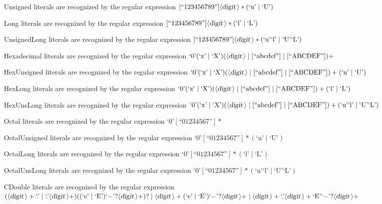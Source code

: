\documentclass[a4paper,11pt]{article}
\begin{document}
Unsigned literals are recognized by the regular expression
\([\mbox{``123456789''}] {\mbox{$\langle \mbox{{\sl digit }} \! \rangle$}}* (\mbox{`u'} \mid \mbox{`U'})\)

Long literals are recognized by the regular expression
\([\mbox{``123456789''}] {\mbox{$\langle \mbox{{\sl digit }} \! \rangle$}}* (\mbox{`l'} \mid \mbox{`L'})\)

UnsignedLong literals are recognized by the regular expression
\([\mbox{``123456789''}] {\mbox{$\langle \mbox{{\sl digit }} \! \rangle$}}* (\mbox{`u'} \mbox{`l'} \mid \mbox{`U'} \mbox{`L'})\)

Hexadecimal literals are recognized by the regular expression
\(\mbox{`0'} (\mbox{`x'} \mid \mbox{`X'}) ({\mbox{$\langle \mbox{{\sl digit }} \! \rangle$}} \mid [\mbox{``abcdef''}] \mid [\mbox{``ABCDEF''}])+\)

HexUnsigned literals are recognized by the regular expression
\(\mbox{`0'} (\mbox{`x'} \mid \mbox{`X'}) ({\mbox{$\langle \mbox{{\sl digit }} \! \rangle$}} \mid [\mbox{``abcdef''}] \mid [\mbox{``ABCDEF''}])+ (\mbox{`u'} \mid \mbox{`U'})\)

HexLong literals are recognized by the regular expression
\(\mbox{`0'} (\mbox{`x'} \mid \mbox{`X'}) ({\mbox{$\langle \mbox{{\sl digit }} \! \rangle$}} \mid [\mbox{``abcdef''}] \mid [\mbox{``ABCDEF''}])+ (\mbox{`l'} \mid \mbox{`L'})\)

HexUnsLong literals are recognized by the regular expression
\(\mbox{`0'} (\mbox{`x'} \mid \mbox{`X'}) ({\mbox{$\langle \mbox{{\sl digit }} \! \rangle$}} \mid [\mbox{``abcdef''}] \mid [\mbox{``ABCDEF''}])+ (\mbox{`u'} \mbox{`l'} \mid \mbox{`U'} \mbox{`L'})\)

Octal literals are recognized by the regular expression
\(\mbox{`0'} [\mbox{``01234567''}]*\)

OctalUnsigned literals are recognized by the regular expression
\(\mbox{`0'} [\mbox{``01234567''}]* (\mbox{`u'} \mid \mbox{`U'})\)

OctalLong literals are recognized by the regular expression
\(\mbox{`0'} [\mbox{``01234567''}]* (\mbox{`l'} \mid \mbox{`L'})\)

OctalUnsLong literals are recognized by the regular expression
\(\mbox{`0'} [\mbox{``01234567''}]* (\mbox{`u'} \mbox{`l'} \mid \mbox{`U'} \mbox{`L'})\)

CDouble literals are recognized by the regular expression
\(({\nonterminal{digit}}+ \mbox{`.'} \mid \mbox{`.'} {\nonterminal{digit}}+) ((\mbox{`e'} \mid \mbox{`E'}) \mbox{`{$-$}'}? {\nonterminal{digit}}+)? \mid {\nonterminal{digit}}+ (\mbox{`e'} \mid \mbox{`E'}) \mbox{`{$-$}'}? {\nonterminal{digit}}+ \mid {\nonterminal{digit}}+ \mbox{`.'} {\nonterminal{digit}}+ \mbox{`E'} \mbox{`{$-$}'}? {\nonterminal{digit}}+\)
\end{document}
